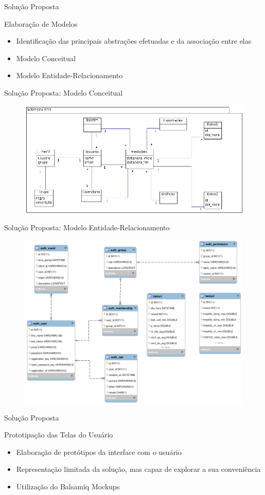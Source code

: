 \begin{frame}{Solução Proposta}
\begin{block}{Elaboração de Modelos}
\begin{itemize}
	\item Identificação das principais abstrações efetuadas e da associação entre elas
	\item Modelo Conceitual
	\item Modelo Entidade-Relacionamento
\end{itemize}
\end{block}
\end{frame}

\begin{frame}{Solução Proposta: Modelo Conceitual}
	\begin{figure}[h!]
	\centering
	\includegraphics[width=0.8\linewidth]{./img/ModeloConceitual}
	\end{figure}
\end{frame}

\begin{frame}{Solução Proposta: Modelo Entidade-Relacionamento}
	\begin{figure}[h!]
	\centering
	\includegraphics[width=0.6\linewidth]{./img/mer}
	\end{figure}
\end{frame}

\begin{frame}{Solução Proposta}
\begin{block}{Prototipação das Telas do Usuário}
\begin{itemize}
	\item Elaboração de protótipos da interface com o usuário
	\item Representação limitada da solução, mas capaz de explorar a sua conveniência
	\item Utilização do Balsamiq Mockups
\end{itemize}
\end{block}
\end{frame}

